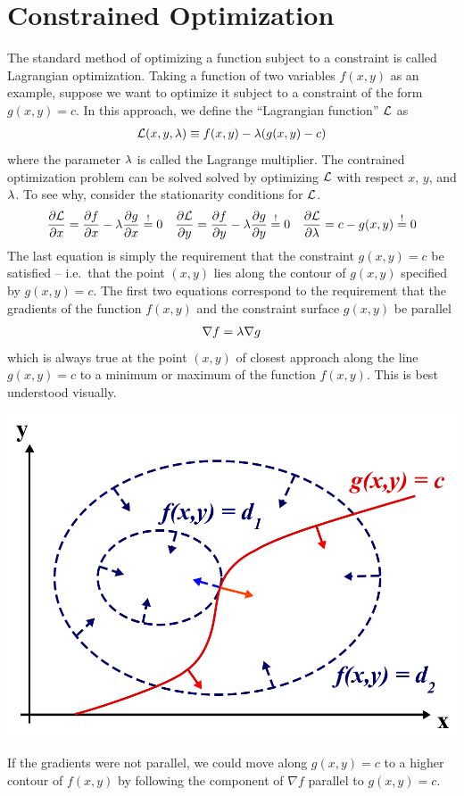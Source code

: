\documentclass[11pt]{article}
\numberwithin{equation}{section}
\begin{document}
\section{Constrained Optimization}\label{app:constrained-optimization}
The standard method of optimizing a function subject to a constraint is called Lagrangian optimization.
Taking a function of two variables $f(x,y)$ as an example, suppose we want to optimize it subject to a constraint of the form $g(x,y)=c$.
In this approach, we define the ``Lagrangian function'' $\mathcal{L}$ as
\begin{align}
  \mathcal{L}(x,y,\lambda )
\equiv
  f(x,y)
-
  \lambda (g(x,y)-c)
\end{align}
where the parameter $\lambda $ is called the Lagrange multiplier.
The contrained optimization problem can be solved solved by optimizing $\mathcal{L}$ with respect $x$, $y$, and $\lambda $.
To see why, consider the stationarity conditions for $\mathcal{L}$.
\begin{align}
  \frac {\partial\mathcal{L}}{\partial x}
=
  \frac {\partial f}{\partial x}
-
  \lambda \frac {\partial g}{\partial x}
\overset{!}=0
&&
  \frac {\partial\mathcal{L}}{\partial y}
=
  \frac {\partial f}{\partial y}
-
  \lambda \frac {\partial g}{\partial y}
\overset{!}=0
&&
  \frac {\partial\mathcal{L}}{\partial\lambda }
=
  c
-
  g(x,y)
\overset{!}=0
\end{align}
The last equation is simply the requirement that the constraint $g(x,y)=c$ be satisfied -- i.e.\ that the point $(x,y)$ lies along the contour of $g(x,y)$ specified by $g(x,y)=c$.
The first two equations correspond to the requirement that the gradients of the function $f(x,y)$ and the constraint surface $g(x,y)$ be parallel
\begin{align}
  \nabla f
=
  \lambda \nabla g
\end{align}
which is always true at the point $(x,y)$ of closest approach along the line $g(x,y)=c$ to a minimum or maximum of the function $f(x,y)$.
This is best understood visually.
\begin{center}
  \includegraphics[width=0.5\linewidth]{figs/lagrangian-optimization.png}
\end{center}
If the gradients were not parallel, we could move along $g(x,y)=c$ to a higher contour of $f(x,y)$ by following the component of $\nabla f$ parallel to $g(x,y)=c$.
\end{document}
